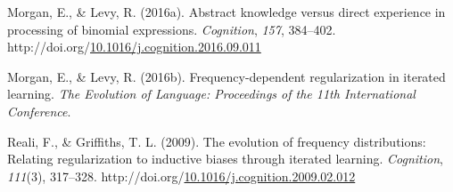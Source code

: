 \documentclass[10pt, letterpaper]{article}
\newenvironment{CSLReferences}%
  {}%
  {\par}
\begin{document}
\begin{CSLReferences}{1}{0}
\leavevmode{}%
Morgan, E., \& Levy, R. (2016a). Abstract knowledge versus direct
experience in processing of binomial expressions. \emph{Cognition},
\emph{157}, 384--402.
http://doi.org/\href{https://doi.org/10.1016/j.cognition.2016.09.011}{10.1016/j.cognition.2016.09.011}

\leavevmode{}%
Morgan, E., \& Levy, R. (2016b). Frequency-dependent regularization in
iterated learning. \emph{The Evolution of Language: Proceedings of the
11th International Conference}.

\leavevmode{}%
Reali, F., \& Griffiths, T. L. (2009). The evolution of frequency
distributions: Relating regularization to inductive biases through
iterated learning. \emph{Cognition}, \emph{111}(3), 317--328.
http://doi.org/\href{https://doi.org/10.1016/j.cognition.2009.02.012}{10.1016/j.cognition.2009.02.012}

\end{CSLReferences}


\end{document}
